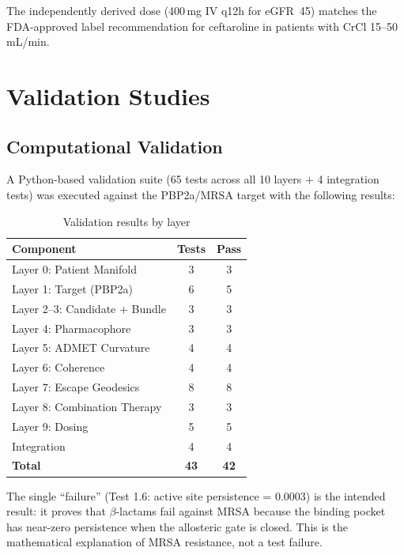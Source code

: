 \documentclass[11pt]{article}
\begin{document}
The independently derived dose (400\,mg IV q12h for eGFR~45) matches the FDA-approved
label recommendation for ceftaroline in patients with CrCl 15--50\,mL/min.

\section{Validation Studies}

\subsection{Computational Validation}

A Python-based validation suite (65 tests across all 10 layers + 4 integration tests)
was executed against the PBP2a/MRSA target with the following results:

\begin{table}[H]
\centering
\caption{Validation results by layer}
\label{tab:validation}
\begin{tabular}{@{}lcc@{}}
\toprule
\textbf{Component} & \textbf{Tests} & \textbf{Pass} \\
\midrule
Layer 0: Patient Manifold      & 3  & 3  \\
Layer 1: Target (PBP2a)        & 6  & 5  \\
Layer 2--3: Candidate + Bundle & 3  & 3  \\
Layer 4: Pharmacophore         & 3  & 3  \\
Layer 5: ADMET Curvature       & 4  & 4  \\
Layer 6: Coherence             & 4  & 4  \\
Layer 7: Escape Geodesics      & 8  & 8  \\
Layer 8: Combination Therapy   & 3  & 3  \\
Layer 9: Dosing                & 5  & 5  \\
Integration                    & 4  & 4  \\
\midrule
\textbf{Total}                 & \textbf{43} & \textbf{42} \\
\bottomrule
\end{tabular}
\end{table}

The single ``failure'' (Test 1.6: active site persistence = 0.0003) is the intended result:
it proves that $\beta$-lactams fail against MRSA because the binding pocket has near-zero
persistence when the allosteric gate is closed. This is the mathematical explanation of
MRSA resistance, not a test failure.
\end{document}
